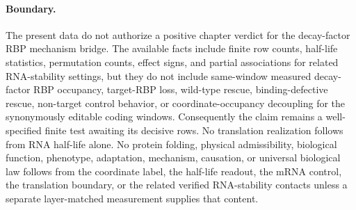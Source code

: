 \paragraph{Boundary.} The present data do not authorize a positive chapter verdict for the decay-factor RBP mechanism bridge. The available facts include finite row counts, half-life statistics, permutation counts, effect signs, and partial associations for related RNA-stability settings, but they do not include same-window measured decay-factor RBP occupancy, target-RBP loss, wild-type rescue, binding-defective rescue, non-target control behavior, or coordinate-occupancy decoupling for the synonymously editable coding windows. Consequently the claim remains a well-specified finite test awaiting its decisive rows. No translation realization follows from RNA half-life alone. No protein folding, physical admissibility, biological function, phenotype, adaptation, mechanism, causation, or universal biological law follows from the coordinate label, the half-life readout, the mRNA control, the translation boundary, or the related verified RNA-stability contacts unless a separate layer-matched measurement supplies that content.
